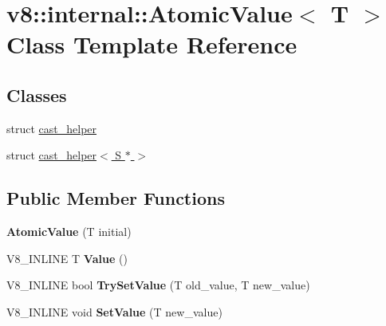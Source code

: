 \hypertarget{classv8_1_1internal_1_1_atomic_value}{}\section{v8\+:\+:internal\+:\+:Atomic\+Value$<$ T $>$ Class Template Reference}
\label{classv8_1_1internal_1_1_atomic_value}
\subsection*{Classes}
\begin{DoxyCompactItemize}
\item 
struct \hyperlink{structv8_1_1internal_1_1_atomic_value_1_1cast__helper}{cast\+\_\+helper}
\item 
struct \hyperlink{structv8_1_1internal_1_1_atomic_value_1_1cast__helper_3_01_s_01_5_01_4}{cast\+\_\+helper$<$ S $\ast$ $>$}
\end{DoxyCompactItemize}
\subsection*{Public Member Functions}
\begin{DoxyCompactItemize}
\item 
{\bfseries Atomic\+Value} (T initial)\hypertarget{classv8_1_1internal_1_1_atomic_value_a5a22d462d0cc4f9dcce796813cd8b414}{}\label{classv8_1_1internal_1_1_atomic_value_a5a22d462d0cc4f9dcce796813cd8b414}

\item 
V8\+\_\+\+I\+N\+L\+I\+NE T {\bfseries Value} ()\hypertarget{classv8_1_1internal_1_1_atomic_value_a3fc361495dd4358bad0d82bab9561f24}{}\label{classv8_1_1internal_1_1_atomic_value_a3fc361495dd4358bad0d82bab9561f24}

\item 
V8\+\_\+\+I\+N\+L\+I\+NE bool {\bfseries Try\+Set\+Value} (T old\+\_\+value, T new\+\_\+value)\hypertarget{classv8_1_1internal_1_1_atomic_value_a9a7def585b59e56f1fe55e518a0daf77}{}\label{classv8_1_1internal_1_1_atomic_value_a9a7def585b59e56f1fe55e518a0daf77}

\item 
V8\+\_\+\+I\+N\+L\+I\+NE void {\bfseries Set\+Value} (T new\+\_\+value)\hypertarget{classv8_1_1internal_1_1_atomic_value_a183ae681a1422c72e6bdf62d9d668bf0}{}\label{classv8_1_1internal_1_1_atomic_value_a183ae681a1422c72e6bdf62d9d668bf0}

\end{DoxyCompactItemize}
